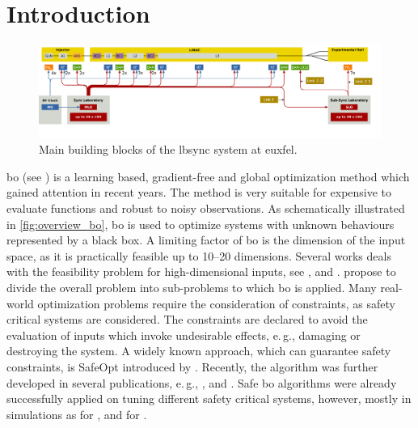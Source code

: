 \documentclass{ifacconf}
\newcommand{\eg}{e.\,g., }
\begin{document}
\section{Introduction} \label{sec:introduction}
\begin{figure}
    \centering
    \includegraphics[width = \textwidth]{figs/xfel.pdf}
    \caption{Main building blocks of the \acrlong{lbsync} system at \gls{euxfel}.}
    \label{fig:lbsync}
\end{figure}
\Gls{bo} (see \cite{mockus2012bayesian}) is a learning based, gradient-free and global optimization method which gained attention in recent years. The method is very suitable for expensive to evaluate functions and robust to noisy observations. As schematically illustrated in \cref{fig:overview_bo}, \gls{bo} is used to optimize systems with unknown behaviours represented by a black box. A limiting factor of \gls{bo} is the dimension of the input space, as it is practically feasible up to \numrange{10}{20} dimensions. Several works deals with the feasibility problem for high-dimensional inputs, see \cite{highdim_bayes_dropout}, \cite{lineBO} and \cite{Moriconi2020}. \cite{lineBO} propose to divide the overall problem into sub-problems to which \gls{bo} is applied. Many real-world optimization problems require the consideration of constraints, as safety critical systems are considered. The constraints are declared to avoid the evaluation of inputs which invoke undesirable effects, \eg damaging or destroying the system. A widely known approach, which can guarantee safety constraints, is SafeOpt introduced by \cite{safeopt1}. Recently, the algorithm was further developed in several publications, \eg \cite{stageopt}, \cite{sasbo} and \cite{safeopt2}. Safe \gls{bo} algorithms were already successfully applied on tuning different safety critical systems, however, mostly in simulations as for \cite{safeBO3}, \cite{heat_pump_annika} and for \cite{contextual_safepid_tuning}.
\end{document}
